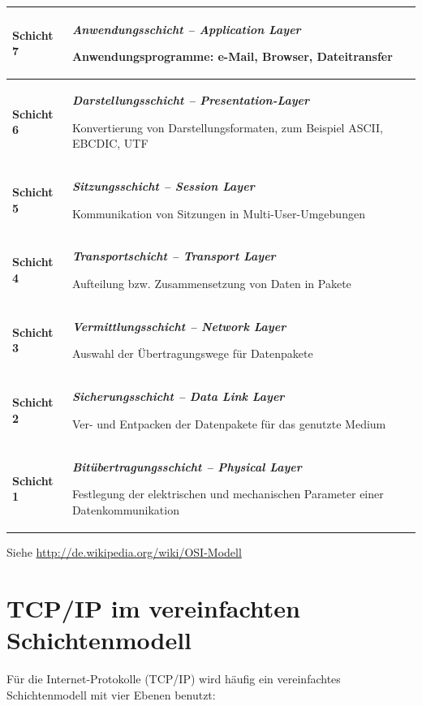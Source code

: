 \begin{center}
\begin{minipage}{0.9\textwidth}
\bgroup
\def\arraystretch{1.2}
\begin{tabularx}{\textwidth}{|p{20mm}|X|}
\hline
\textbf{Schicht 7} &
\textbf{\emph{Anwendungsschicht -- Application Layer}}

Anwendungsprogramme: e-Mail, Browser, Dateitransfer
\\ \hline
\textbf{Schicht 6} &
\textbf{\emph{Darstellungsschicht -- Presentation-Layer}}

Konvertierung von Darstellungsformaten, zum Beispiel ASCII, EBCDIC, UTF
\\ \hline
\textbf{Schicht 5} &
\textbf{\emph{Sitzungsschicht -- Session Layer}}

Kommunikation von Sitzungen in Multi-User-Umgebungen
\\ \hline
\textbf{Schicht 4} &
\textbf{\emph{Transportschicht -- Transport Layer}}

Aufteilung bzw. Zusammensetzung von Daten in Pakete
\\ \hline
\textbf{Schicht 3} &
\textbf{\emph{Vermittlungsschicht -- Network Layer}}

Auswahl der Übertragungswege für Datenpakete
\\ \hline
\textbf{Schicht 2} &
\textbf{\emph{Sicherungsschicht -- Data Link Layer}}

Ver- und Entpacken der Datenpakete für das genutzte Medium
\\ \hline
\textbf{Schicht 1} &
\textbf{\emph{Bitübertragungsschicht -- Physical Layer}}

Festlegung der elektrischen und mechanischen Parameter einer Datenkommunikation
\\ \hline
\end{tabularx}
\egroup
\end{minipage}
\end{center}

Siehe \url{http://de.wikipedia.org/wiki/OSI-Modell}


\section{TCP/IP im vereinfachten Schichtenmodell}

Für die Internet-Protokolle (TCP/IP) wird häufig ein vereinfachtes
Schichtenmodell mit vier Ebenen benutzt:

